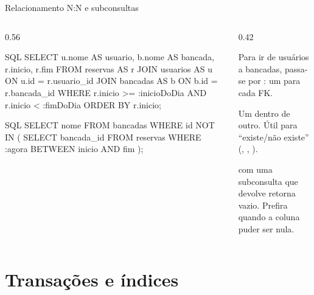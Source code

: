 \documentclass[aspectratio=169,10pt]{beamer}
\begin{document}
\begin{frame}[fragile]{Relacionamento N:N e subconsultas}
  \begin{columns}[T]
    \begin{column}{0.56\textwidth}
\begin{codigo}[title=Agenda do dia (N:N)]{SQL}
SELECT u.nome AS usuario, b.nome AS bancada,
       r.inicio, r.fim
FROM   reservas AS r
JOIN   usuarios AS u ON u.id = r.usuario_id
JOIN   bancadas AS b ON b.id = r.bancada_id
WHERE  r.inicio >= :inicioDoDia
  AND  r.inicio <  :fimDoDia
ORDER  BY r.inicio;
\end{codigo}
\begin{codigo}[title=Bancadas livres agora (subconsulta)]{SQL}
SELECT nome FROM bancadas
WHERE  id NOT IN (
  SELECT bancada_id FROM reservas
  WHERE  :agora BETWEEN inicio AND fim
);
\end{codigo}
    \end{column}
    \begin{column}{0.42\textwidth}
      \begin{conceito}
        Para ir de usuários a bancadas, passa-se por : um  para cada FK.
      \end{conceito}
      \begin{conceito}[Subconsulta]
        Um  dentro de outro. Útil para ``existe/não existe'' (, , ).
      \end{conceito}
      \begin{atencao}
         com uma subconsulta que devolve  retorna vazio. Prefira  quando a coluna puder ser nula.
      \end{atencao}
    \end{column}
  \end{columns}
\end{frame}

\section{Transações e índices}
\end{document}
